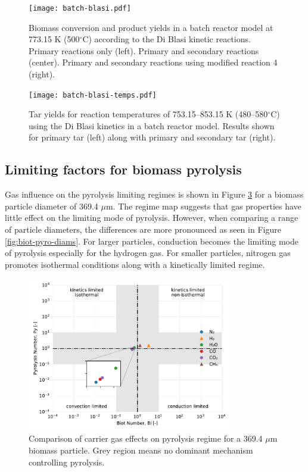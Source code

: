 \begin{figure}[H]
    \centering
    \texttt{[image: batch-blasi.pdf]}
    \caption{Biomass conversion and product yields in a batch reactor model at 773.15 K (500$^\circ$C) according to the Di Blasi kinetic reactions. Primary reactions only (left). Primary and secondary reactions (center). Primary and secondary reactions using modified reaction 4 (right).}
    \label{fig:batch-blasi}
\end{figure}

\begin{figure}[H]
    \centering
    \texttt{[image: batch-blasi-temps.pdf]}
    \caption{Tar yields for reaction temperatures of 753.15--853.15 K (480--580$^\circ$C) using the Di Blasi kinetics in a batch reactor model. Results shown for primary tar (left) along with primary and secondary tar (right).}
    \label{fig:batch-blasi-temps}
\end{figure}


\subsection{Limiting factors for biomass pyrolysis}

Gas influence on the pyrolysis limiting regimes is shown in Figure \ref{fig:biot-pyro-gases} for a biomass particle diameter of 369.4 $\mu$m. The regime map suggests that gas properties have little effect on the limiting mode of pyrolysis. However, when comparing a range of particle diameters, the differences are more pronounced as seen in Figure \ref{fig:biot-pyro-diams}. For larger particles, conduction becomes the limiting mode of pyrolysis especially for the hydrogen gas. For smaller particles, nitrogen gas promotes isothermal conditions along with a kinetically limited regime.

\begin{figure}[H]
    \centering
    \includegraphics[width=0.8\textwidth]{figures/biot-pyro-gases.pdf}
    \caption{Comparison of carrier gas effects on pyrolysis regime for a 369.4 $\mu$m biomass particle. Grey region means no dominant mechanism controlling pyrolysis.}
    \label{fig:biot-pyro-gases}
\end{figure}

